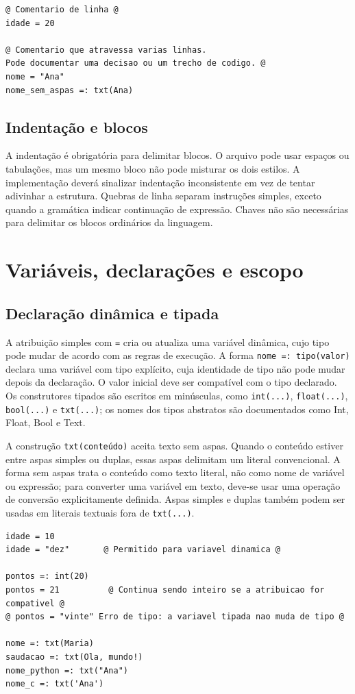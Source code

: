 \documentclass[12pt,a4paper]{article}
\begin{document}
\begin{lstlisting}
@ Comentario de linha @
idade = 20

@ Comentario que atravessa varias linhas.
Pode documentar uma decisao ou um trecho de codigo. @
nome = "Ana"
nome_sem_aspas =: txt(Ana)
\end{lstlisting}

\subsection{Indentação e blocos}
A indentação é obrigatória para delimitar blocos. O arquivo pode usar espaços ou tabulações, mas um mesmo bloco não pode misturar os dois estilos. A implementação deverá sinalizar indentação inconsistente em vez de tentar adivinhar a estrutura. Quebras de linha separam instruções simples, exceto quando a gramática indicar continuação de expressão. Chaves não são necessárias para delimitar os blocos ordinários da linguagem.

\section{Variáveis, declarações e escopo}
\subsection{Declaração dinâmica e tipada}
A atribuição simples com \texttt{=} cria ou atualiza uma variável dinâmica, cujo tipo pode mudar de acordo com as regras de execução. A forma \texttt{nome =: tipo(valor)} declara uma variável com tipo explícito, cuja identidade de tipo não pode mudar depois da declaração. O valor inicial deve ser compatível com o tipo declarado. Os construtores tipados são escritos em minúsculas, como \texttt{int(...)}, \texttt{float(...)}, \texttt{bool(...)} e \texttt{txt(...)}; os nomes dos tipos abstratos são documentados como Int, Float, Bool e Text.

A construção \texttt{txt(conteúdo)} aceita texto sem aspas. Quando o conteúdo estiver entre aspas simples ou duplas, essas aspas delimitam um literal convencional. A forma sem aspas trata o conteúdo como texto literal, não como nome de variável ou expressão; para converter uma variável em texto, deve-se usar uma operação de conversão explicitamente definida. Aspas simples e duplas também podem ser usadas em literais textuais fora de \texttt{txt(...)}.

\begin{lstlisting}
idade = 10
idade = "dez"       @ Permitido para variavel dinamica @

pontos =: int(20)
pontos = 21          @ Continua sendo inteiro se a atribuicao for compativel @
@ pontos = "vinte" Erro de tipo: a variavel tipada nao muda de tipo @

nome =: txt(Maria)
saudacao =: txt(Ola, mundo!)
nome_python =: txt("Ana")
nome_c =: txt('Ana')
\end{lstlisting}
\end{document}
